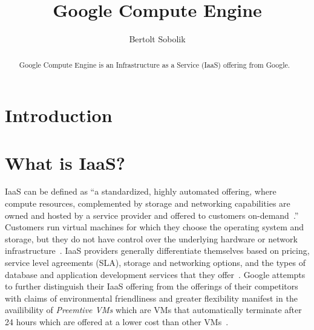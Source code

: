 
\title{Google Compute Engine}


\author{Bertolt Sobolik}

\renewcommand{\shortauthors}{B. Sobolik}


\begin{abstract}
Google Compute Engine is an Infrastructure as a Service (IaaS)
offering from Google.
\end{abstract}



\maketitle

\section{Introduction}

\section{What is IaaS?}

IaaS can be defined as ``a standardized, highly automated offering,
where compute resources, complemented by storage and networking
capabilities are owned and hosted by a service provider and offered to
customers on-demand~\cite{hid-sp18-419-gartneritglossaryiaas}.''
Customers run virtual machines for which they choose the operating
system and storage, but they do not have control over the underlying
hardware or network
infrastructure~\cite{hid-sp18-419-mell2011nist}. IaaS providers
generally differentiate themselves based on pricing, service level
agreements (SLA), storage and networking options, and the types of
database and application development services that they
offer~\cite{hid-sp18-419-perficientchoosingiaas}. Google attempts to
further distinguish their IaaS offering from the offerings of their
competitors with claims of environmental friendliness and greater
flexibility manifest in the availibility of \textit{Preemtive VMs}
which are VMs that automatically terminate after 24 hours which are
offered at a lower cost than other VMs~\cite{hid-sp18-419-gce}.


